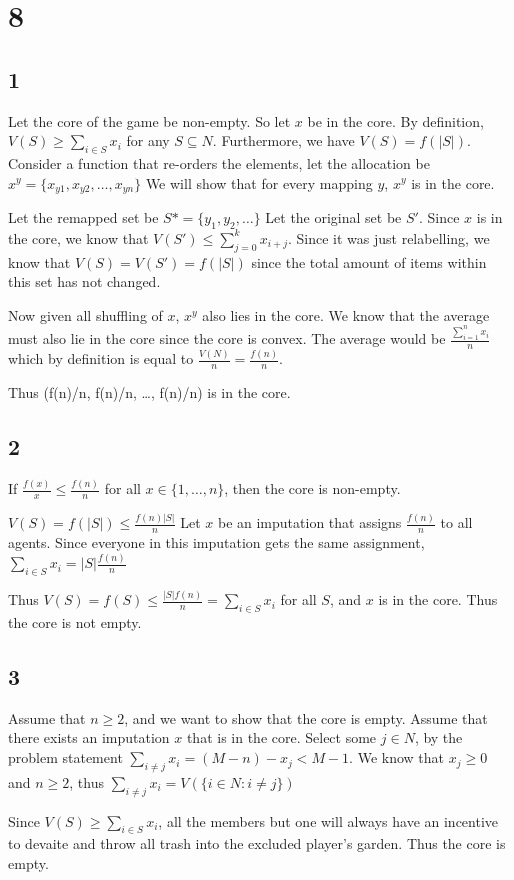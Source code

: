 \documentclass[12pt]{article}
\begin{document}
\newpage
\section*{8}
\subsection*{1}
Let the core of the game be non-empty. So let $x$ be in the core. By definition, $V(S) \geq \sum_{i\in S} x_i$ for any $S \subseteq N$. 
Furthermore, we have $V(S)= f(|S|)$. Consider a function that re-orders the elements, let the allocation be $x^y = \{x_{y1}, x_{y2}, \ldots, x_{yn}\}$
We will show that for every mapping $y$, $x^y$ is in the core. 

Let the remapped set be $S* = \{y_1, y_2, \ldots\}$
Let the original set be $S'$. Since $x$ is in the core, we know that $V(S') \leq \sum_{j=0}^kx_{i+j}$. Since it was 
just relabelling, we know that $V(S) = V(S') = f(|S|)$ since the total amount of items within this set has not changed.

Now given all shuffling of $x$, $x^y$ also lies in the core. We know that the average must also lie in the core since 
the core is convex. The average would be $\frac{\sum_{i=1}^{n}x_i}{n}$ which by definition is equal to $\frac{V(N)}{n} = \frac{f(n)}{n}$.

Thus (f(n)/n, f(n)/n, \ldots, f(n)/n) is in the core.


\subsection*{2}
If $\frac{f(x)}{x}\leq \frac{f(n)}{n}$ for all $x \in \{1, \ldots, n\}$, then the core is 
non-empty. 

$V(S) = f(|S|) \leq \frac{f(n)|S|}{n}$
Let $x$ be an imputation that assigns $\frac{f(n)}{n}$ to all agents. Since everyone in this imputation gets 
the same assignment, $\sum_{i \in S}x_i = |S| \frac{f(n)}{n}$

Thus $V(S) = f(S) \leq \frac{|S|f(n)}{n} = \sum_{i \in S}x_i$ for all $S$, and $x$ is in the core. 
Thus the core is not empty.

\subsection*{3}
Assume that $n \geq 2$, and we want to show that the core is empty. Assume that there exists an imputation $x$ that is in the core. 
Select some $j \in N$, by the problem statement
$\sum_{i \neq j}x_i = (M-n)-x_j < M-1$. We know that $x_j \geq 0$ and $n \geq 2$, thus 
$\sum_{i \neq j}x_i = V(\{i \in N: i \neq j\})$

Since $V(S) \geq \sum_{i \in S}x_i$, all the members but one will always have an incentive to devaite and 
throw all trash into the excluded player's garden. Thus the core is empty.
\end{document}
